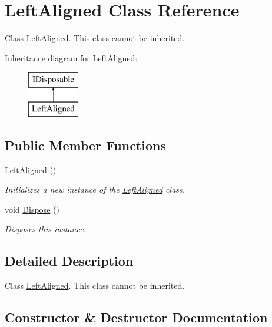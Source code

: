 \hypertarget{class_left_aligned}{}\section{Left\+Aligned Class Reference}
\label{class_left_aligned}


Class \hyperlink{class_left_aligned}{Left\+Aligned}. This class cannot be inherited.  


Inheritance diagram for Left\+Aligned\+:\begin{figure}[H]
\begin{center}
\leavevmode
\includegraphics[height=2.000000cm]{class_left_aligned}
\end{center}
\end{figure}
\subsection*{Public Member Functions}
\begin{DoxyCompactItemize}
\item 
\hyperlink{class_left_aligned_a12862a54252a1481146747d328f00fb7}{Left\+Aligned} ()
\begin{DoxyCompactList}\small\item\em Initializes a new instance of the \hyperlink{class_left_aligned}{Left\+Aligned} class. \end{DoxyCompactList}\item 
void \hyperlink{class_left_aligned_a1dda8d272d06dc5b2c6678072bb122ab}{Dispose} ()
\begin{DoxyCompactList}\small\item\em Disposes this instance. \end{DoxyCompactList}\end{DoxyCompactItemize}


\subsection{Detailed Description}
Class \hyperlink{class_left_aligned}{Left\+Aligned}. This class cannot be inherited. 



\subsection{Constructor \& Destructor Documentation}
\mbox{\label{class_left_aligned_a12862a54252a1481146747d328f00fb7}} 
